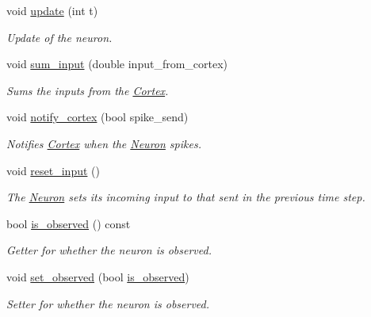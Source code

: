 \begin{DoxyCompactItemize}
void \hyperlink{class_neuron_afa48309ba910b2528c036ceaae310e07}{update} (int t)
\begin{DoxyCompactList}\small\item\em Update of the neuron. \end{DoxyCompactList}\item 
\hypertarget{class_neuron_a9cac950fd38acce42fc348e4ed97b6ed}{}\label{class_neuron_a9cac950fd38acce42fc348e4ed97b6ed} 
void \hyperlink{class_neuron_a9cac950fd38acce42fc348e4ed97b6ed}{sum\+\_\+input} (double input\+\_\+from\+\_\+cortex)
\begin{DoxyCompactList}\small\item\em Sums the inputs from the \hyperlink{class_cortex}{Cortex}. \end{DoxyCompactList}\item 
void \hyperlink{class_neuron_a741570188e5a493e183ef37a15d628e8}{notify\+\_\+cortex} (bool spike\+\_\+send)
\begin{DoxyCompactList}\small\item\em Notifies \hyperlink{class_cortex}{Cortex} when the \hyperlink{class_neuron}{Neuron} spikes. \end{DoxyCompactList}\item 
void \hyperlink{class_neuron_ac4d5b2ee5e8c26ecab684afa3f85ca6e}{reset\+\_\+input} ()
\begin{DoxyCompactList}\small\item\em The \hyperlink{class_neuron}{Neuron} sets its incoming input to that sent in the previous time step. \end{DoxyCompactList}\item 
\hypertarget{class_neuron_acdae79e598d78507694c5447cc85f0f7}{}\label{class_neuron_acdae79e598d78507694c5447cc85f0f7} 
bool \hyperlink{class_neuron_acdae79e598d78507694c5447cc85f0f7}{is\+\_\+observed} () const
\begin{DoxyCompactList}\small\item\em Getter for whether the neuron is observed. \end{DoxyCompactList}\item 
\hypertarget{class_neuron_a3fab86dd8c415d68a918d0d649cf45ca}{}\label{class_neuron_a3fab86dd8c415d68a918d0d649cf45ca} 
void \hyperlink{class_neuron_a3fab86dd8c415d68a918d0d649cf45ca}{set\+\_\+observed} (bool \hyperlink{class_neuron_acdae79e598d78507694c5447cc85f0f7}{is\+\_\+observed})
\begin{DoxyCompactList}\small\item\em Setter for whether the neuron is observed. \end{DoxyCompactList}\end{DoxyCompactItemize}



